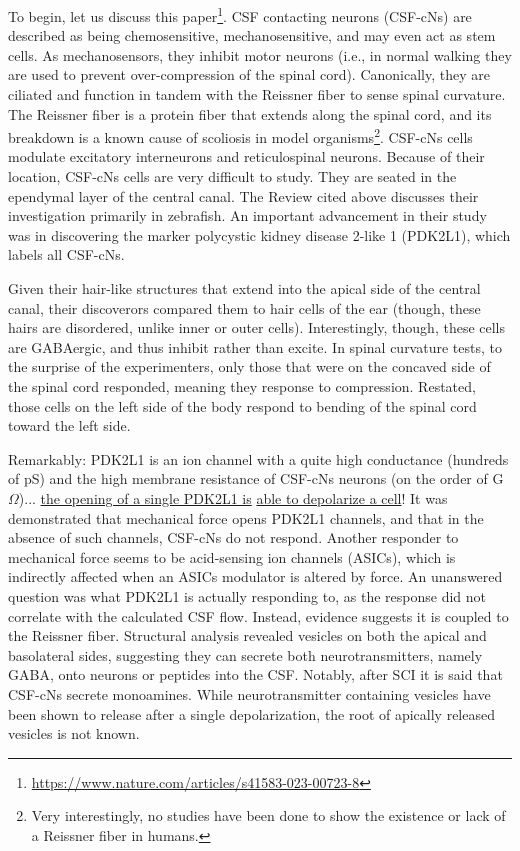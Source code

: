 To begin, let us discuss this paper\footnote{\url{https://www.nature.com/articles/s41583-023-00723-8}}. CSF contacting neurons (CSF-cNs) are described as being chemosensitive, mechanosensitive, and may even act as stem cells. As mechanosensors, they inhibit motor neurons (i.e., in normal walking they are used to prevent over-compression of the spinal cord). Canonically, they are ciliated and function in tandem with the Reissner fiber to sense spinal curvature. The Reissner fiber is a protein fiber that extends along the spinal cord, and its breakdown is a known cause of scoliosis in model organisms\footnote{Very interestingly, no studies have been done to show the existence or lack of a Reissner fiber in humans.}. CSF-cNs cells modulate excitatory interneurons and reticulospinal neurons. Because of their location, CSF-cNs cells are very difficult to study. They are seated in the ependymal layer of the central canal. The Review cited above discusses their investigation primarily in zebrafish. An important advancement in their study was in discovering the marker polycystic kidney disease 2-like 1 (PDK2L1), which labels all CSF-cNs.\newline

Given their hair-like structures that extend into the apical side of the central canal, their discoverors compared them to hair cells of the ear (though, these hairs are disordered, unlike inner or outer cells). Interestingly, though, these cells are GABAergic, and thus inhibit rather than excite. In spinal curvature tests, to the surprise of the experimenters, only those that were on the concaved side of the spinal cord responded, meaning they response to compression. Restated, those cells on the left side of the body respond to bending of the spinal cord toward the left side.\newline 

Remarkably: PDK2L1 is an ion channel with a quite high conductance (hundreds of pS) and the high membrane resistance of CSF-cNs neurons (on the order of G$\Omega$)... \underline{the opening of a single PDK2L1 is}  \underline{able to depolarize a cell}! It was demonstrated that mechanical force opens PDK2L1 channels, and that in the absence of such channels, CSF-cNs do not respond. Another responder to mechanical force seems to be acid-sensing ion channels (ASICs), which is indirectly affected when an ASICs modulator is altered by force. An unanswered question was what PDK2L1 is actually responding to, as the response did not correlate with the calculated CSF flow. Instead, evidence suggests it is coupled to the Reissner fiber. Structural analysis revealed vesicles on both the apical and basolateral sides, suggesting they can secrete both neurotransmitters, namely GABA, onto neurons or peptides into the CSF. Notably, after SCI it is said that CSF-cNs secrete monoamines. While neurotransmitter containing vesicles have been shown to release after a single depolarization, the root of apically released vesicles is not known.\newline


